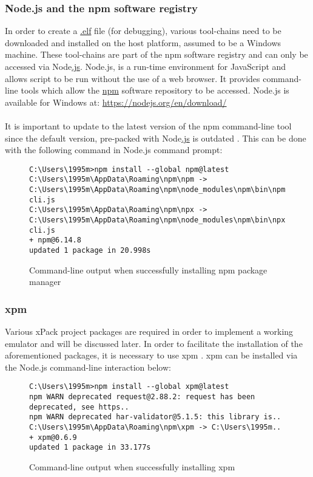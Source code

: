 \subsubsection{Node.js and the npm software registry}
\label{npm}
In order to create a \hyperref[listExt]{.elf} file (for debugging), various tool-chains need to be downloaded and installed on the host platform, assumed to be a Windows machine. These tool-chains are part of the npm software registry and can only be accessed via  Node\hyperref[listExt]{.js}. Node.js, is a run-time environment for JavaScript and allows script to be run without the use of a web browser. It provides command-line tools which allow the \hyperref[listAbr]{npm} software repository to be accessed. Node.js is available for Windows at: \color{blue}\url{https://nodejs.org/en/download/} \color{black}
\\\\
It is important to update to the latest version of the npm command-line tool since the default version, pre-packed with Node\hyperref[listExt]{.js} is outdated \cite{emailIl}\cite{xPack}. This can be done with the following command in Node.js command prompt:

\begin{figure}[H]
\begin{center}
\begin{lstlisting}[style=DOS]
C:\Users\1995m>npm install --global npm@latest
C:\Users\1995m\AppData\Roaming\npm\npm -> C:\Users\1995m\AppData\Roaming\npm\node_modules\npm\bin\npm-cli.js
C:\Users\1995m\AppData\Roaming\npm\npx -> C:\Users\1995m\AppData\Roaming\npm\node_modules\npm\bin\npx-cli.js
+ npm@6.14.8
updated 1 package in 20.998s
\end{lstlisting}
\label{fig:cmd1}
\caption{Command-line output when successfully installing npm package manager}
\end{center}
\end{figure}

\subsubsection{xpm}
\label{xpm}
Various xPack project packages are required in order to implement a working emulator and will be discussed later. In order to facilitate the installation of the aforementioned packages, it is necessary to use xpm \cite{xPack}. xpm can be installed via the Node.js command-line interaction below:

\begin{figure}[H]
\begin{center}
\begin{lstlisting}[style=DOS]
C:\Users\1995m>npm install --global xpm@latest
npm WARN deprecated request@2.88.2: request has been deprecated, see https..
npm WARN deprecated har-validator@5.1.5: this library is..
C:\Users\1995m\AppData\Roaming\npm\xpm -> C:\Users\1995m..
+ xpm@0.6.9
updated 1 package in 33.177s
\end{lstlisting}
\caption{Command-line output when successfully installing xpm}
\label{fig:cmd2}
\end{center}
\end{figure}

